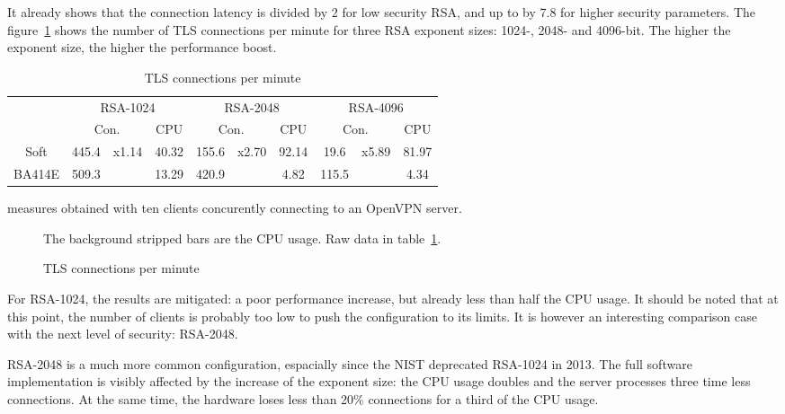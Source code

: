 It already shows that the connection latency is divided by 2 for low security RSA, and up to by 7.8 for higher security parameters.
The figure~\ref{fig:openvpn-tls-bench} shows the number of TLS connections per minute for three RSA exponent sizes: 1024-, 2048- and 4096-bit.
The higher the exponent size, the higher the performance boost.


\begin{table}[ht]
\center
\small
\begin{tabular}{l|c|c|c|c|c|c|c|c|c|} \cline{2-10}
 & \multicolumn{3}{c|}{RSA-1024} & \multicolumn{3}{c|}{RSA-2048} & \multicolumn{3}{c|}{RSA-4096} \\ \cline{2-10}
 & \multicolumn{2}{c|}{Con.} & CPU & \multicolumn{2}{c|}{Con.} & CPU & \multicolumn{2}{|c|}{Con.} & CPU \\ \hline
\multicolumn{1}{|c|}{Soft} & 445.4 & \multirow{2}{*}{x1.14} & 40.32 & 155.6& \multirow{2}{*}{x2.70}  & 92.14 & 19.6& \multirow{2}{*}{x5.89}  & 81.97 \\ \cline{1-2}\cline{4-5}\cline{7-8}\cline{10-10}
\multicolumn{1}{|c|}{BA414E} & 509.3 & & 13.29 & 420.9 & & 4.82 & 115.5 & & 4.34 \\ \hline
\end{tabular}
\caption{TLS connections per minute}{measures obtained with ten clients concurently connecting to an OpenVPN server.}
\label{tab:tls-con}
\end{table}

\begin{figure}[ht]
\center

\caption{TLS connections per minute}{The background stripped bars are the CPU usage. Raw data in table~\ref{tab:tls-con}.}
\label{fig:openvpn-tls-bench}
\end{figure}


\noindent For RSA-1024, the results are mitigated: a poor performance increase, but already less than half the CPU usage.
It should be noted that at this point, the number of clients is probably too low to push the configuration to its limits.
It is however an interesting comparison case with the next level of security: RSA-2048.

\noindent RSA-2048 is a much more common configuration, espacially since the NIST deprecated RSA-1024 in 2013.
The full software implementation is visibly affected by the increase of the exponent size: the CPU usage doubles and the server processes three time less connections.
At the same time, the hardware loses less than 20\% connections for a third of the CPU usage.


